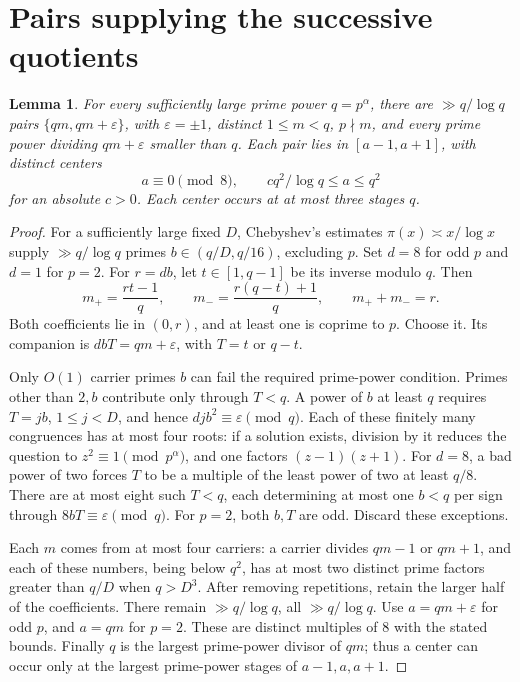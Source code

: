 \documentclass[11pt]{article}
\newtheorem{lemma}{Lemma}
\begin{document}
\section{Pairs supplying the successive quotients}

\begin{lemma}\label{pairs}
For every sufficiently large prime power \(q=p^\alpha\), there are
\(\gg q/\log q\) pairs \(\{qm,qm+\varepsilon\}\), with
\(\varepsilon=\pm1\), distinct \(1\le m<q\), \(p\nmid m\), and every
prime power dividing \(qm+\varepsilon\) smaller than \(q\).
Each pair lies in \([a-1,a+1]\), with distinct centers
\[
              a\equiv0\pmod8,\qquad cq^2/\log q\le a\le q^2
\]
for an absolute \(c>0\). Each center occurs at at most three stages \(q\).
\end{lemma}

\begin{proof}
For a sufficiently large fixed \(D\), Chebyshev's estimates
\(\pi(x)\asymp x/\log x\) \cite{HW} supply \(\gg q/\log q\) primes
\(b\in(q/D,q/16)\), excluding \(p\). Set \(d=8\) for odd \(p\)
and \(d=1\) for \(p=2\).
For \(r=db\), let \(t\in[1,q-1]\) be its inverse modulo \(q\).
Then
\[
 m_+=\frac{rt-1}{q},\qquad
 m_-=\frac{r(q-t)+1}{q},\qquad m_++m_-=r.
\]
Both coefficients lie in \((0,r)\), and at least one is coprime to
\(p\). Choose it. Its companion is \(dbT=qm+\varepsilon\), with
\(T=t\) or \(q-t\).

Only \(O(1)\) carrier primes \(b\) can fail the required
prime-power condition. Primes other than \(2,b\) contribute only
through \(T<q\). A power of \(b\) at least \(q\) requires
\(T=jb\), \(1\le j<D\), and hence
\(djb^2\equiv\varepsilon\pmod q\).
Each of these finitely many congruences has at most four roots:
if a solution exists, division by it reduces the question to
\(z^2\equiv1\pmod{p^\alpha}\), and one factors \((z-1)(z+1)\).
For \(d=8\), a bad power of two forces \(T\) to be a multiple
of the least power of two at least \(q/8\). There are at most
eight such \(T<q\), each determining at most one \(b<q\) per
sign through \(8bT\equiv\varepsilon\pmod q\).
For \(p=2\), both \(b,T\) are odd. Discard these exceptions.

Each \(m\) comes from at most four carriers: a carrier divides
\(qm-1\) or \(qm+1\), and each of these numbers, being below \(q^2\),
has at most two distinct prime factors greater than \(q/D\)
when \(q>D^3\).
After removing repetitions, retain the larger half of the
coefficients. There remain \(\gg q/\log q\), all
\(\gg q/\log q\).
Use \(a=qm+\varepsilon\) for odd \(p\), and \(a=qm\) for \(p=2\).
These are distinct multiples of \(8\) with the stated bounds.
Finally \(q\) is the largest prime-power divisor of \(qm\);
thus a center can occur only at the largest prime-power stages
of \(a-1,a,a+1\).
\end{proof}
\end{document}
